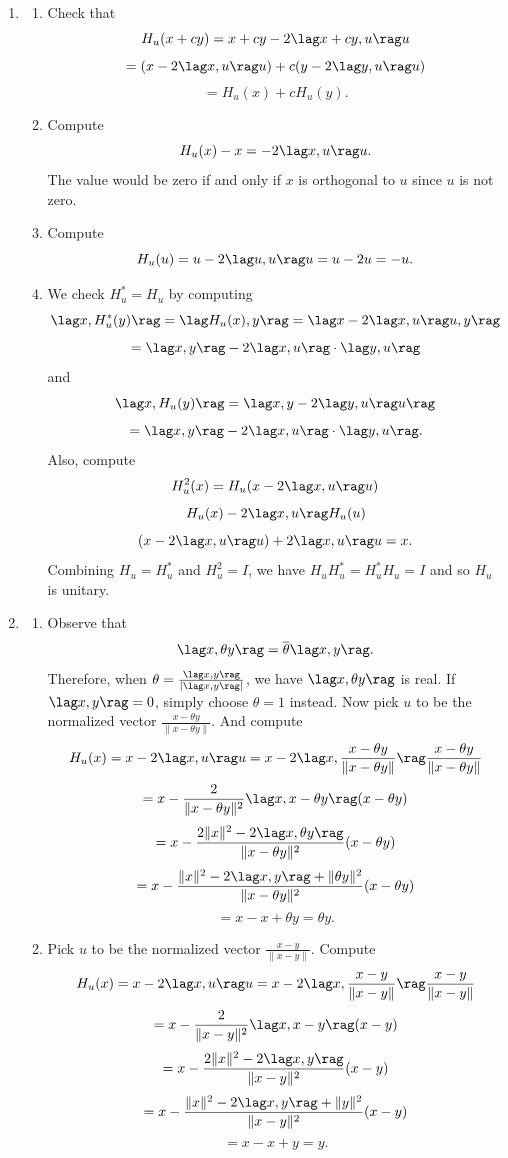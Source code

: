 \begin{enumerate}
\item \begin{enumerate}
\item Check that 
\[H_u(x+cy)=x+cy-2\lag x+cy,u\rag u\]
\[=(x-2\lag x,u\rag u)+c(y-2\lag y,u\rag u)\]
\[=H_u(x)+cH_u(y).\]
\item Compute 
\[H_u(x)-x=-2\lag x,u\rag u .\]
The value would be zero if and only if $x$ is orthogonal to $u$ since $u$ is not zero.
\item Compute 
\[H_u(u)=u-2\lag u,u\rag u=u-2u=-u.\]
\item We check $H_u^*=H_u$ by computing 
\[\lag x,H_u^*(y)\rag =\lag H_u(x),y\rag =\lag x-2\lag x,u\rag u,y\rag \]
\[=\lag x,y\rag -2\lag x,u\rag \cdot \lag y,u\rag \]
and 
\[\lag x,H_u(y)\rag =\lag x,y-2\lag y,u\rag u\rag\]
\[=\lag x,y\rag -2\lag x,u\rag \cdot \lag y,u\rag .\]
Also, compute
\[H_u^2(x)=H_u(x-2\lag x,u\rag u)\]
\[H_u(x)-2\lag x,u\rag H_u(u)\]
\[(x-2\lag x,u\rag u)+2\lag x,u\rag u=x.\]
Combining $H_u=H_u^*$ and $H_u^2=I$, we have $H_uH_u^*=H_u^*H_u=I$ and so $H_u$ is unitary.
\end{enumerate}
\item \begin{enumerate}
\item Observe that  
\[
    \lag x, \theta y\rag = \overline{\theta}\lag x,y \rag.
\]
Therefore, when $\theta = \frac{\lag x,y\rag}{|\lag x,y\rag|}$, we have $\lag x, \theta y\rag$ is real. If $\lag x,y\rag = 0$, simply choose $\theta = 1$ instead.  Now pick $u$ to be the normalized vector $\frac{x-\theta y}{\|x-\theta y\|}$. And compute 
\[H_u(x)=x-2\lag x,u\rag u=x-2\lag x,\frac{x-\theta y}{\|x-\theta y\|}\rag \frac{x-\theta y}{\|x-\theta y\|}\]
\[=x-\frac{2}{\|x-\theta y\|^2}\lag x,x-\theta y\rag (x-\theta y)\]
\[=x-\frac{2\|x\|^2-2\lag x,\theta y\rag }{\|x-\theta y\|^2}(x-\theta y)\]
\[=x-\frac{\|x\|^2-2\lag x,y\rag +\|\theta y\|^2}{\|x-\theta y\|^2}(x-\theta y)\]
\[=x-x+\theta y=\theta y.\]
\item Pick $u$ to be the normalized vector $\frac{x-y}{\|x-y\|}$. Compute 
\[H_u(x)=x-2\lag x,u\rag u=x-2\lag x,\frac{x-y}{\|x-y\|}\rag \frac{x-y}{\|x-y\|}\]
\[=x-\frac{2}{\|x-y\|^2}\lag x,x-y\rag (x-y)\]
\[=x-\frac{2\|x\|^2-2\lag x,y\rag }{\|x-y\|^2}(x-y)\]
\[=x-\frac{\|x\|^2-2\lag x,y\rag +\|y\|^2}{\|x-y\|^2}(x-y)\]
\[=x-x+y=y.\]
\end{enumerate}
\end{enumerate}


